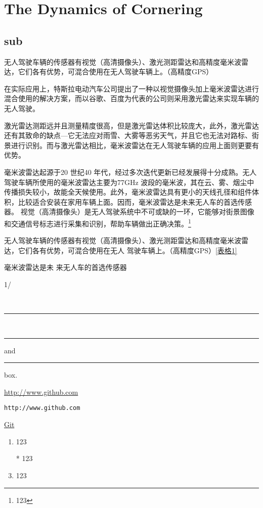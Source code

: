 
\section[Cornering]{The Dynamics of Cornering}
		\subsection{sub}
\noindent 无人驾驶车辆的传感器有视觉（高清摄像头）、激光测距雷达和高精度毫米波雷达，它们各有优势，可混合使用在无人驾驶车辆上。（高精度GPS）\par
在实际应用上，特斯拉电动汽车公司提出了一种以视觉摄像头加上毫米波雷达进行混合使用的解决方案，而以谷歌、百度为代表的公司则采用激光雷达来实现车辆的无人驾驶。\par
激光雷达测距远并且测量精度很高，但是激光雷达体积比较庞大，此外，激光雷达还有其致命的缺点—它无法应对雨雪、大雾等恶劣天气，并且它也无法对路标、街景进行识别。而与激光雷达相比，毫米波雷达在无人驾驶车辆的应用上面则更要有优势。 \par
毫米波雷达起源于20 世纪40 年代，经过多次迭代更新已经发展得十分成熟。无人驾驶车辆所使用的毫米波雷达主要为77GHz 波段的毫米波，其在云、雾、烟尘中传播损失较小，故能全天候使用。此外，毫米波雷达具有更小的天线孔径和组件体积，比较适合安装在家用车辆上面。因而，毫米波雷达是未来无人车的首选传感器。
视觉（高清摄像头）是无人驾驶系统中不可或缺的一环，它能够对街景图像和交通信号标志进行采集和识别，帮助车辆做出正确决策。\footnote{123}\par
{\CTEXnoindent 无人驾驶车辆的传感器有视觉（高清摄像头）、激光测距雷达和高精度毫米波雷达，它们各有优势，可混合使用在无人  驾驶车辆上。（高精度GPS）\ref{表格1}\par}
{毫米波雷达是未 来无人车的首选传感器}

1/\textperthousand{}

\\
\rule{4pt}{4pt}\\
\rule[4pt]{6pt}{8pt} and
\rule[-4pt]{6pt}{8pt} box.



\url{http://www.github.com}\par
\nolinkurl{http://www.github.com} \par
\href{http://www.baidu.com}{Git}

		\begin{enumerate}
			\item 123
			\item[*] 123
			\item 123
		\end{enumerate}
	
